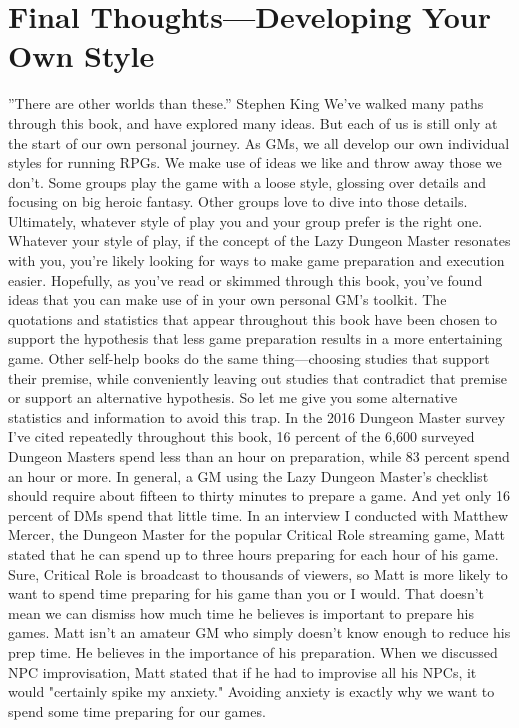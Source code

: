 \documentclass[10pt,a4paper,twoside,bg=print,twocolumn,openany,nodeprecatedcode]{dndbook}
\begin{document}
\section{Final Thoughts—Developing Your Own Style}
\DndQuote%
{}
{''There are other worlds than these.''}
{Stephen King}
We've walked many paths through this book, and have explored many ideas. But each of us is still only at the start of our own personal journey. As GMs, we all develop our own individual styles for running RPGs. We make use of ideas we like and throw away those we don't. Some groups play the game with a loose style, glossing over details and focusing on big heroic fantasy. Other groups love to dive into those details. Ultimately, whatever style of play you and your group prefer is the right one.
Whatever your style of play, if the concept of the Lazy Dungeon Master resonates with you, you're likely looking for ways to make game preparation and execution easier. Hopefully, as you've read or skimmed through this book, you've found ideas that you can make use of in your own personal GM's toolkit.
The quotations and statistics that appear throughout this book have been chosen to support the hypothesis that less game preparation results in a more entertaining game. Other self-help books do the same thing—choosing studies that support their premise, while conveniently leaving out studies that contradict that premise or support an alternative hypothesis. So let me give you some alternative statistics and information to avoid this trap.
In the 2016 Dungeon Master survey I've cited repeatedly throughout this book, 16 percent of the 6,600 surveyed Dungeon Masters spend less than an hour on preparation, while 83 percent spend an hour or more. In general, a GM using the Lazy Dungeon Master's checklist should require about fifteen to thirty minutes to prepare a game. And yet only 16 percent of DMs spend that little time.
In an interview I conducted with Matthew Mercer, the Dungeon Master for the popular Critical Role streaming game, Matt stated that he can spend up to three hours preparing for each hour of his game. Sure, Critical Role is broadcast to thousands of viewers, so Matt is more likely to want to spend time preparing for his game than you or I would. That doesn't mean we can dismiss how much time he believes is important to prepare his games.
Matt isn't an amateur GM who simply doesn't know enough to reduce his prep time. He believes in the importance of his preparation. When we discussed NPC improvisation, Matt stated that if he had to improvise all his NPCs, it would "certainly spike my anxiety." Avoiding anxiety is exactly why we want to spend some time preparing for our games.
\end{document}
